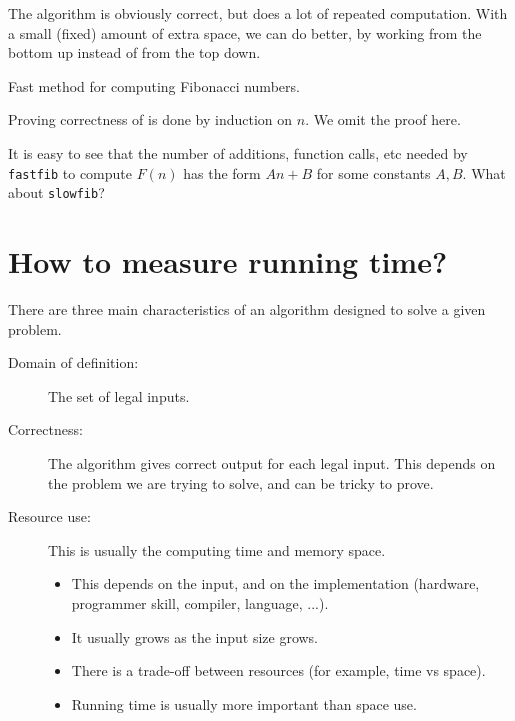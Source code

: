 The algorithm  is obviously correct, but does a lot of repeated computation. 
With a small (fixed) amount of extra space, we can do better, 
by working from the bottom up instead of from the top down.

\begin{algorithm}[H]
  \caption{Fast method for computing Fibonacci numbers.}
    \label{alg:fastfib}
\begin{algorithmic}[1]
	\Else
		 	
		  
		\EndFor
	\EndIf
	\State {}
\EndFunction
\end{algorithmic}
\end{algorithm}
 
Proving correctness of  is done by induction on $n$.  We omit the proof here.
\begin{Boxample}[6]
It is easy to see that the number of additions, function calls, etc needed by 
\texttt{fastfib} to compute $F(n)$ has the form $An + B$ for some constants $A, B$.
What about \texttt{slowfib}?
\end{Boxample}


\chapter{How to measure running time?} %
There are three main characteristics of an algorithm designed to solve a given problem.
\begin{description}
	\item[Domain of definition:] The set of legal inputs. 
	\item[Correctness:] The algorithm gives correct output for each legal input. 
	This depends on the problem we are trying to solve, and can be tricky to prove. 
	\item[Resource use:] This is usually the computing time and memory space. 
	\begin{itemize} 
		\item This depends on the input, and on the implementation 
		(hardware, programmer skill, compiler, language, ...). 
		\item It usually grows as the input size grows. 
		\item There is a trade-off between resources (for example, time vs space). 
		\item Running time is usually more important than space use. 
	\end{itemize}
\end{description}

